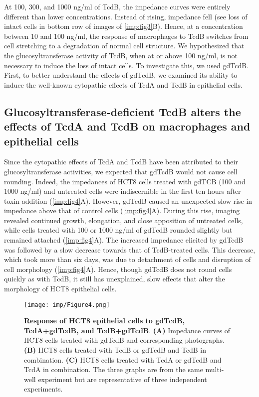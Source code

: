 At 100, 300, and 1000 ng/ml of TcdB, the impedance curves were 
entirely different than lower concentrations. Instead of 
rising, impedance fell (see loss of intact cells in bottom 
row of images of \autoref{imp:fig3}B). Hence, at a concentration 
between 10 and 100 ng/ml, the response of macrophages to 
TcdB switches from cell stretching to a degradation of 
normal cell structure. We hypothesized that the 
glucosyltransferase activity of TcdB, when at or above 
100 ng/ml, is not necessary to induce the loss of intact 
cells. To investigate this, we used gdTcdB. First, to 
better understand the effects of gdTcdB, we examined its 
ability to induce the well-known cytopathic effects of TcdA 
and TcdB in epithelial cells.

\subsection{Glucosyltransferase-deficient TcdB alters the effects of TcdA and TcdB
              on macrophages and epithelial cells}
Since the cytopathic effects of TcdA and TcdB have been 
attributed to their glucosyltransferase activities, we expected 
that gdTcdB would not cause cell rounding. Indeed, the 
impedances of HCT8 cells treated with gdTCB (100 and 1000 ng/ml) 
and untreated cells were indiscernible in the first ten 
hours after toxin addition (\autoref{imp:fig4}A). However, gdTcdB 
caused an unexpected slow rise in impedance above that of 
control cells (\autoref{imp:fig4}A). During this rise, imaging revealed 
continued growth, elongation, and close apposition of 
untreated cells, while cells treated with 100 or 1000 ng/ml 
of gdTcdB rounded slightly but remained attached (\autoref{imp:fig4}A). 
The increased impedance elicited by gdTcdB was followed by 
a slow decrease towards that of TcdB-treated cells. This 
decrease, which took more than six days, was due to 
detachment of cells and disruption of cell morphology 
(\autoref{imp:fig4}A). Hence, though gdTcdB does not round 
cells quickly as with TcdB, it still has unexplained, 
slow effects that alter the morphology of HCT8 epithelial cells.

\begin{figure}[h!]
  \centering
  \texttt{[image: imp/Figure4.png]}
  \caption[Response of HCT8 epithelial cells to gdTcdB, 
             TcdA+gdTcdB, and TcdB+gdTcdB]{
       \textbf{Response of HCT8 epithelial cells to 
               gdTcdB, TcdA+gdTcdB, and TcdB+gdTcdB}.
       \textbf{(A)} Impedance curves of HCT8 cells treated with 
       gdTcdB and corresponding photographs. 
       \textbf{(B)} HCT8 cells 
       treated with TcdB or gdTcdB and TcdB in combination. 
       \textbf{(C)} HCT8 cells treated with TcdA or gdTcdB 
       and TcdA in combination. The three graphs are 
       from the same multi-well experiment but are 
       representative of three independent experiments.
  }
  \label{imp:fig4}
\end{figure}

